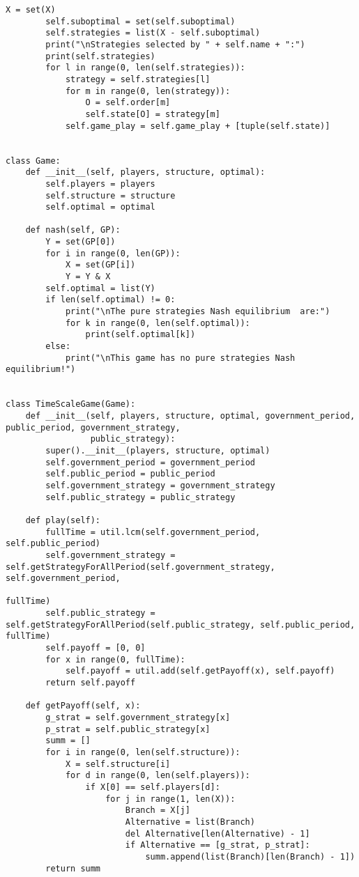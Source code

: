 \begin{lstlisting}[style=fsharpstyle]
        X = set(X)
        self.suboptimal = set(self.suboptimal)
        self.strategies = list(X - self.suboptimal)
        print("\nStrategies selected by " + self.name + ":")
        print(self.strategies)
        for l in range(0, len(self.strategies)):
            strategy = self.strategies[l]
            for m in range(0, len(strategy)):
                O = self.order[m]
                self.state[O] = strategy[m]
            self.game_play = self.game_play + [tuple(self.state)]


class Game:
    def __init__(self, players, structure, optimal):
        self.players = players
        self.structure = structure
        self.optimal = optimal

    def nash(self, GP):
        Y = set(GP[0])
        for i in range(0, len(GP)):
            X = set(GP[i])
            Y = Y & X
        self.optimal = list(Y)
        if len(self.optimal) != 0:
            print("\nThe pure strategies Nash equilibrium  are:")
            for k in range(0, len(self.optimal)):
                print(self.optimal[k])
        else:
            print("\nThis game has no pure strategies Nash equilibrium!")


class TimeScaleGame(Game):
    def __init__(self, players, structure, optimal, government_period, public_period, government_strategy,
                 public_strategy):
        super().__init__(players, structure, optimal)
        self.government_period = government_period
        self.public_period = public_period
        self.government_strategy = government_strategy
        self.public_strategy = public_strategy

    def play(self):
        fullTime = util.lcm(self.government_period, self.public_period)
        self.government_strategy = self.getStrategyForAllPeriod(self.government_strategy, self.government_period,
                                                                fullTime)
        self.public_strategy = self.getStrategyForAllPeriod(self.public_strategy, self.public_period, fullTime)
        self.payoff = [0, 0]
        for x in range(0, fullTime):
            self.payoff = util.add(self.getPayoff(x), self.payoff)
        return self.payoff

    def getPayoff(self, x):
        g_strat = self.government_strategy[x]
        p_strat = self.public_strategy[x]
        summ = []
        for i in range(0, len(self.structure)):
            X = self.structure[i]
            for d in range(0, len(self.players)):
                if X[0] == self.players[d]:
                    for j in range(1, len(X)):
                        Branch = X[j]
                        Alternative = list(Branch)
                        del Alternative[len(Alternative) - 1]
                        if Alternative == [g_strat, p_strat]:
                            summ.append(list(Branch)[len(Branch) - 1])
        return summ



\end{lstlisting}
